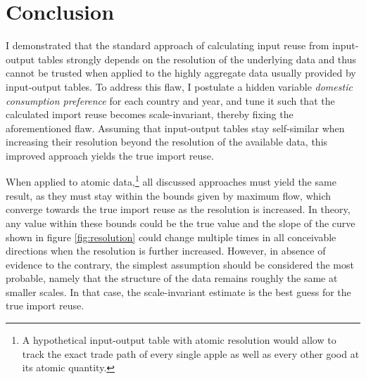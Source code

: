 \documentclass[english]{uzhpub}
\begin{document}

\section{Conclusion}
\label{sec:conclusion}
I demonstrated that the standard approach of calculating input reuse from input-output tables strongly depends on the resolution of the underlying data and thus cannot be trusted when applied to the highly aggregate data usually provided by input-output tables. To address this flaw, I postulate a hidden variable \emph{domestic consumption preference} for each country and year, and tune it such that the calculated import reuse becomes scale-invariant, thereby fixing the aforementioned flaw. Assuming that input-output tables stay self-similar when increasing their resolution beyond the resolution of the available data, this improved approach yields the true import reuse.

When applied to atomic data,\footnote{A hypothetical input-output table with atomic resolution would allow to track the exact trade path of every single apple as well as every other good at its atomic quantity.} all discussed approaches must yield the same result, as they must stay within the bounds given by maximum flow, which converge towards the true import reuse as the resolution is increased. In theory, any value within these bounds could be the true value and the slope of the curve shown in figure \ref{fig:resolution} could change multiple times in all conceivable directions when the resolution is further increased. However, in absence of evidence to the contrary, the simplest assumption should be considered the most probable, namely that the structure of the data remains roughly the same at smaller scales. In that case, the scale-invariant estimate is the best guess for the true import reuse.
\end{document}
